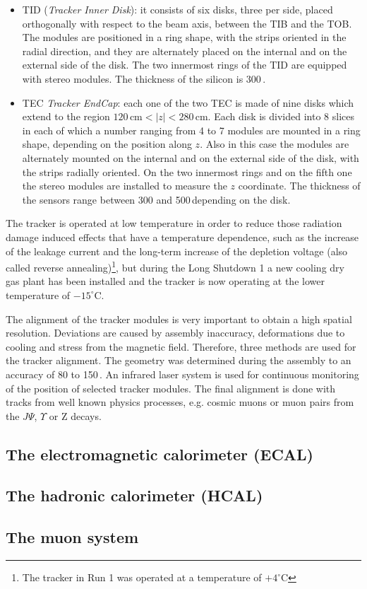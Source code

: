 \begin{itemize}
\item TID (\emph{Tracker Inner Disk}): it consists of six disks, three per side, placed orthogonally with respect to the beam axis, between the TIB and the TOB. The modules are positioned in a ring shape, with the strips oriented in the radial direction, and they are alternately placed on the internal and on the external side of the disk. The two innermost rings of the TID are equipped with stereo modules. The thickness of the silicon is 300\,\micron.
\item TEC {\emph{Tracker EndCap}}: each one of the two TEC is made of nine disks which extend to the region $120\,\mathrm{cm} < |z| < 280\,\mathrm{cm}$. Each disk is divided into 8 slices in each of which a number ranging from 4 to 7 modules are mounted in a ring shape, depending on the position along $z$. Also in this case the modules are alternately mounted on the internal and on the external side of the disk, with the strips radially oriented. On the two innermost rings and on the fifth one the stereo modules are installed to measure the $z$ coordinate. The thickness of the sensors range between 300 and 500\,\micron depending on the disk.
\end{itemize}

The tracker is operated at low temperature in order to reduce those radiation damage induced effects that have a temperature dependence, such as the increase of the leakage current and the long-term increase of the depletion voltage (also called reverse annealing)\footnote{The tracker in Run 1 was operated at a temperature of $+4^{\circ}$C}, but during the Long Shutdown 1 a new cooling dry gas plant has been installed and the tracker is now operating at the lower temperature of $-15^{\circ}$C.

The alignment of the tracker modules is very important to obtain a high spatial resolution. Deviations are caused by assembly inaccuracy, deformations due to cooling and stress from the magnetic field. Therefore, three methods are used for the tracker alignment.
The geometry was determined during the assembly to an accuracy of 80 to 150\,\micron. An infrared laser system is used for continuous monitoring of the position of selected tracker modules. The final alignment is done with tracks from well known physics processes, e.g. cosmic muons or muon pairs from the $J\Psi$, $\Upsilon$ or Z decays.
\subsection{The electromagnetic calorimeter (ECAL)}

\subsection{The hadronic calorimeter (HCAL)}



\subsection{The muon system}

